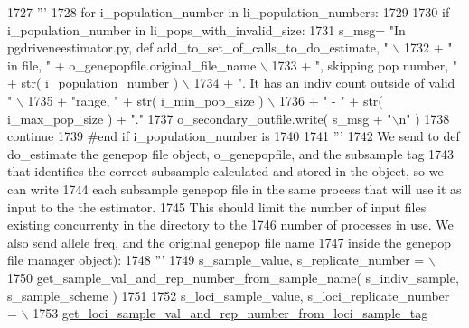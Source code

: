 \begin{DoxyCode}
1727 \textcolor{stringliteral}{            '''}
1728             \textcolor{keywordflow}{for} i\_population\_number \textcolor{keywordflow}{in} li\_population\_numbers:
1729 
1730                 \textcolor{keywordflow}{if} i\_population\_number \textcolor{keywordflow}{in} li\_pops\_with\_invalid\_size:
1731                     s\_msg= \textcolor{stringliteral}{"In pgdriveneestimator.py, def add\_to\_set\_of\_calls\_to\_do\_estimate, "} \(\backslash\)
1732                                     + \textcolor{stringliteral}{" in file, "} + o\_genepopfile.original\_file\_name \(\backslash\)
1733                                     + \textcolor{stringliteral}{", skipping pop number, "}  + str( i\_population\_number ) \(\backslash\)
1734                                     + \textcolor{stringliteral}{".  It has an indiv count outside of valid "} \(\backslash\)
1735                                     + \textcolor{stringliteral}{"range, "} + str( i\_min\_pop\_size ) \(\backslash\)
1736                                     + \textcolor{stringliteral}{" - "} + str( i\_max\_pop\_size ) + \textcolor{stringliteral}{"."}
1737                     o\_secondary\_outfile.write( s\_msg + \textcolor{stringliteral}{"\(\backslash\)n"} )
1738                     \textcolor{keywordflow}{continue}
1739                 \textcolor{comment}{#end if i\_population\_number is}
1740 
1741                 \textcolor{stringliteral}{'''}
1742 \textcolor{stringliteral}{                We send to def do\_estimate the genepop file object, o\_genepopfile, and the subsample tag}
1743 \textcolor{stringliteral}{                that identifies the correct subsample calculated and stored in the object, so we can write}
1744 \textcolor{stringliteral}{                each subsample genepop file in the same process that will use it as input to the the
       estimator.}
1745 \textcolor{stringliteral}{                This should limit the number of input files existing concurrenty in the directory to the }
1746 \textcolor{stringliteral}{                number of processes in use.  We also send allele freq, and the original genepop file name }
1747 \textcolor{stringliteral}{                inside the genepop file manager object):}
1748 \textcolor{stringliteral}{                '''}
1749                 s\_sample\_value, s\_replicate\_number = \(\backslash\)
1750                         get\_sample\_val\_and\_rep\_number\_from\_sample\_name( s\_indiv\_sample, s\_sample\_scheme )
1751 
1752                 s\_loci\_sample\_value, s\_loci\_replicate\_number = \(\backslash\)
1753                         \hyperlink{namespacenegui_1_1pgdriveneestimator_abd853ec3bf6e5ad25f39ba0b41302f14}{get\_loci\_sample\_val\_and\_rep\_number\_from\_loci\_sample\_tag}

\end{DoxyCode}
